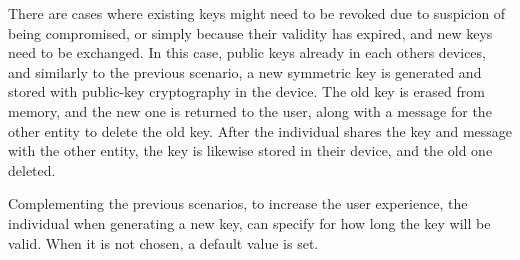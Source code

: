 There are cases where existing keys might need to be revoked due to suspicion of being compromised, or simply because their validity has expired, and new keys need to be exchanged. In this case, public keys already in each others devices, and similarly to the previous scenario, a new symmetric key is generated and stored with public-key cryptography in the device. The old key is erased from memory, and the new one is returned to the user, along with a message for the other entity to delete the old key. After the individual shares the key and message with the other entity, the key is likewise stored in their device, and the old one deleted.

Complementing the previous scenarios, to increase the user experience, the individual when generating a new key, can specify for how long the key will be valid. When it is not chosen, a default value is set.

